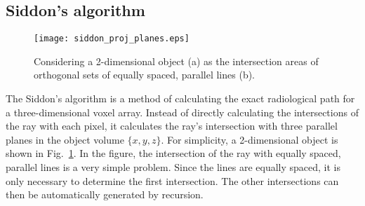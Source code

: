 \subsection{Siddon's algorithm}
%
\begin{figure}
\centering
\texttt{[image: siddon\_proj\_planes.eps]}
\caption{Considering a 2-dimensional object (a) as the intersection areas of orthogonal sets of equally spaced, parallel lines (b).}
\label{fig:forward_backward_model}
\end{figure}
%
The Siddon's algorithm is a method of calculating the exact radiological path for a three-dimensional voxel array.  Instead of directly calculating the intersections of the ray with each pixel, it calculates the ray's intersection with three parallel planes in the object volume $\{ x, y, z \}$.  For simplicity, a 2-dimensional object is shown in Fig.~\ref{fig:forward_backward_model}.  In the figure, the intersection of the ray with equally spaced, parallel lines is a very simple problem.  Since the lines are equally spaced, it is only necessary to determine the first intersection.  The other intersections can then be automatically generated by recursion.  

